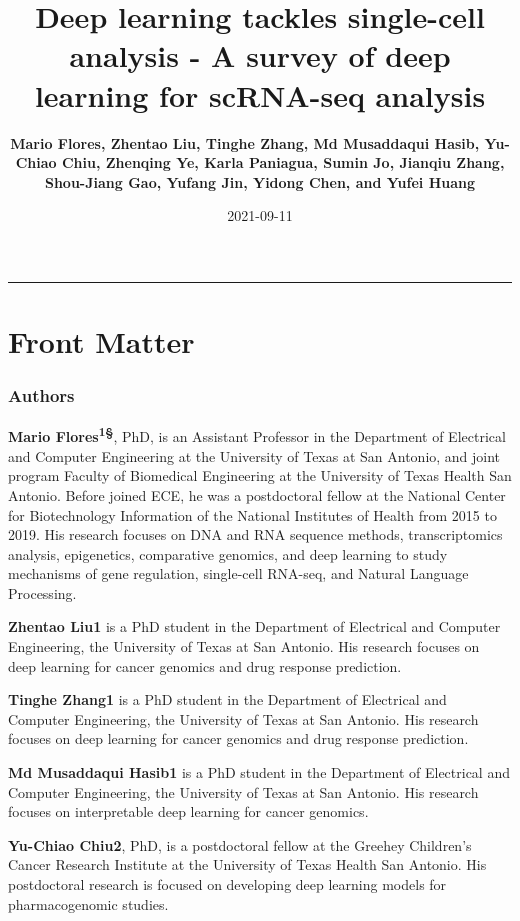 \documentclass[
]{book}
\title{Deep learning tackles single-cell analysis - A survey of deep learning for scRNA-seq analysis}
\author{\textbf{Mario Flores, Zhentao Liu, Tinghe Zhang, Md Musaddaqui Hasib, Yu-Chiao Chiu, Zhenqing Ye, Karla Paniagua, Sumin Jo, Jianqiu Zhang, Shou-Jiang Gao, Yufang Jin, Yidong Chen, and Yufei Huang}}
\date{2021-09-11}
\begin{document}
\maketitle

{
\setcounter{tocdepth}{1}
\tableofcontents
}
\begin{center}\rule{0.5\linewidth}{0.5pt}\end{center}

\hypertarget{front-matter}{%
\chapter*{Front Matter}\label{front-matter}}

\hypertarget{authors}{%
\subsection*{Authors}\label{authors}}

\textbf{Mario Flores\textsuperscript{1§}}, PhD, is an Assistant Professor in the Department of Electrical and Computer Engineering at the University of Texas at San Antonio, and joint program Faculty of Biomedical Engineering at the University of Texas Health San Antonio. Before joined ECE, he was a postdoctoral fellow at the National Center for Biotechnology Information of the National Institutes of Health from 2015 to 2019. His research focuses on DNA and RNA sequence methods, transcriptomics analysis, epigenetics, comparative genomics, and deep learning to study mechanisms of gene regulation, single-cell RNA-seq, and Natural Language Processing.

\textbf{Zhentao Liu1} is a PhD student in the Department of Electrical and Computer Engineering, the University of Texas at San Antonio. His research focuses on deep learning for cancer genomics and drug response prediction.

\textbf{Tinghe Zhang1} is a PhD student in the Department of Electrical and Computer Engineering, the University of Texas at San Antonio. His research focuses on deep learning for cancer genomics and drug response prediction.

\textbf{Md Musaddaqui Hasib1} is a PhD student in the Department of Electrical and Computer Engineering, the University of Texas at San Antonio. His research focuses on interpretable deep learning for cancer genomics.

\textbf{Yu-Chiao Chiu2}, PhD, is a postdoctoral fellow at the Greehey Children's Cancer Research Institute at the University of Texas Health San Antonio. His postdoctoral research is focused on developing deep learning models for pharmacogenomic studies.
\end{document}
